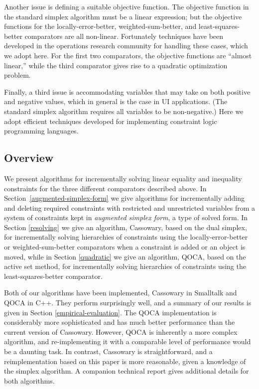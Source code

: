 \documentclass{uist96}
\newcommand{\ignore}[1]{}
\begin{document}
Another issue is defining a suitable objective function.  The objective
function in the standard simplex algorithm must be a linear expression; but
the objective functions for the locally-error-better,
weighted-sum-better, and least-squares-better comparators are all
non-linear.  Fortunately techniques have been developed in the operations
research community for handling these cases, which we adopt here.  For the
first two comparators, the objective functions are ``almost linear,''
while the third comparator gives rise to a quadratic
optimization problem.
\ignore{leading to the quasi-linear optimization technique described in Section
\ref{quasi-linear}.  Least-squares-better results in a quadratic
optimization problem, which is solved using the technique described in
Section \ref{quadratic}. } 

Finally, a third issue is accommodating variables that may take on both
positive and negative values, which in general is the case in UI
applications.  (The standard simplex algorithm requires all variables to be
non-negative.)  Here we adopt efficient techniques developed for
implementing constraint logic programming languages.

\subsection{Overview}

We present algorithms for incrementally solving linear equality and
inequality constraints for the three different comparators described
above. In Section~\ref{augmented-simplex-form} we give algorithms for
incrementally adding and deleting required constraints with restricted and
unrestricted variables from a system of constraints kept in {\em augmented
simplex form}, a type of solved form.  In Section \ref{resolving} we give
an algorithm, Cassowary, based on the dual simplex, for incrementally
solving hierarchies of constraints using the locally-error-better or
weighted-sum-better comparators when a constraint is added or an object is
moved, while in Section \ref{quadratic} we give an algorithm, QOCA, based
on the active set method, for incrementally solving hierarchies of
constraints using the least-squares-better comparator.

Both of our algorithms have been implemented,
Cassowary in Smalltalk and QOCA in C++\@. 
They perform surprisingly well, and
a summary of our results is given in Section \ref{empirical-evaluation}. 
The QOCA
implementation is considerably more sophisticated and has much better
performance than the current version of Cassowary.  
However, QOCA is inherently a more
complex algorithm, and re-implementing it with a comparable level of
performance would be a daunting task.    
In contrast, Cassowary
is straightforward, and a reimplementation based on this paper is more
reasonable, given a knowledge of the simplex algorithm.  A companion
technical report \cite{borning-simplex-tr} gives additional details for
both algorithms.
\end{document}
